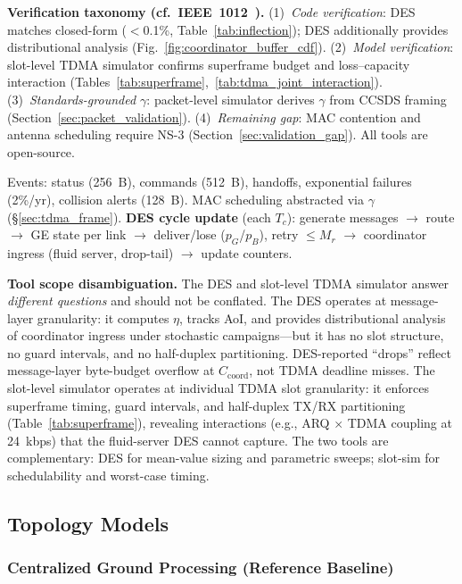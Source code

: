 \documentclass[journal]{IEEEtran}
\begin{document}
\textbf{Verification taxonomy (cf.\ IEEE~1012~\cite{ieee_1012}).} (1)~\emph{Code verification}: DES matches closed-form ($<$0.1\%, Table~\ref{tab:inflection}); DES additionally provides distributional analysis (Fig.~\ref{fig:coordinator_buffer_cdf}). (2)~\emph{Model verification}: slot-level TDMA simulator confirms superframe budget and loss--capacity interaction (Tables~\ref{tab:superframe},~\ref{tab:tdma_joint_interaction}). (3)~\emph{Standards-grounded $\gamma$}: packet-level simulator derives $\gamma$ from CCSDS framing (Section~\ref{sec:packet_validation}). (4)~\emph{Remaining gap}: MAC contention and antenna scheduling require NS-3 (Section~\ref{sec:validation_gap}). All tools are open-source.

Events: status (256~B), commands (512~B), handoffs, exponential failures (2\%/yr), collision alerts (128~B). MAC scheduling abstracted via $\gamma$ (\S\ref{sec:tdma_frame}). \textbf{DES cycle update} (each $T_c$): generate messages $\to$ route $\to$ GE state per link $\to$ deliver/lose ($p_G$/$p_B$), retry $\leq M_r$ $\to$ coordinator ingress (fluid server, drop-tail) $\to$ update counters.

\textbf{Tool scope disambiguation.} The DES and slot-level TDMA simulator answer \emph{different questions} and should not be conflated. The DES operates at message-layer granularity: it computes $\eta$, tracks AoI, and provides distributional analysis of coordinator ingress under stochastic campaigns---but it has no slot structure, no guard intervals, and no half-duplex partitioning. DES-reported ``drops'' reflect message-layer byte-budget overflow at $C_{\text{coord}}$, not TDMA deadline misses. The slot-level simulator operates at individual TDMA slot granularity: it enforces superframe timing, guard intervals, and half-duplex TX/RX partitioning (Table~\ref{tab:superframe}), revealing interactions (e.g., ARQ $\times$ TDMA coupling at 24~kbps) that the fluid-server DES cannot capture. The two tools are complementary: DES for mean-value sizing and parametric sweeps; slot-sim for schedulability and worst-case timing.

\subsection{Topology Models}

\subsubsection{Centralized Ground Processing (Reference Baseline)}
\end{document}
